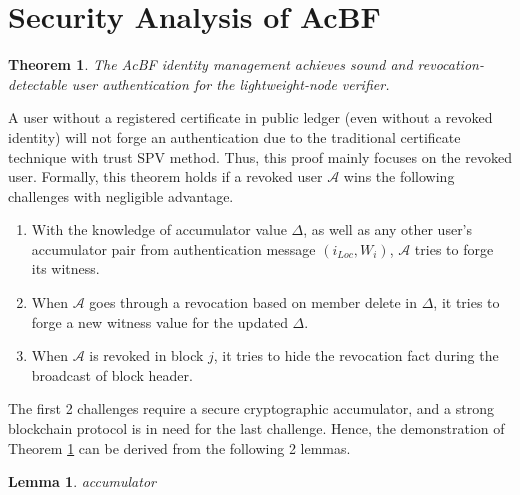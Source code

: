 \documentclass[conference]{IEEEtran}
\newtheorem{theorem}{Theorem}
\newtheorem{lemma}{Lemma}[theorem]
\begin{document}

\section{Security Analysis of AcBF}\label{sec:security}
\begin{theorem}\label{theo:security}
	The AcBF identity management achieves sound and revocation-detectable user authentication for the lightweight-node verifier.
\end{theorem}

\begin{IEEEproof}
    A user without a registered certificate in public ledger (even without a revoked identity) will not forge an authentication due to the traditional certificate technique with trust SPV method. Thus, this proof mainly focuses on the revoked user. Formally, this theorem holds if a revoked user $\mathcal{A}$ wins the following challenges with negligible advantage.
    \begin{enumerate}
        \item With the knowledge of accumulator value $\Delta$, as well as any other user's accumulator pair from authentication message $(i_{Loc}, W_i)$, $\mathcal{A}$ tries to forge its witness.
        \item When $\mathcal{A}$ goes through a revocation based on member delete in $\Delta$, it tries to forge a new witness value for the updated $\Delta$.
        \item When $\mathcal{A}$ is revoked in block $j$, it tries to hide the revocation fact during the broadcast of block header.
    \end{enumerate}

    The first 2 challenges require a secure cryptographic accumulator, and a strong blockchain protocol is in need for the last challenge. Hence, the demonstration of Theorem \ref{theo:security} can be derived from the following 2 lemmas.
\end{IEEEproof}
\begin{lemma}
    accumulator
\end{lemma}
\end{document}

